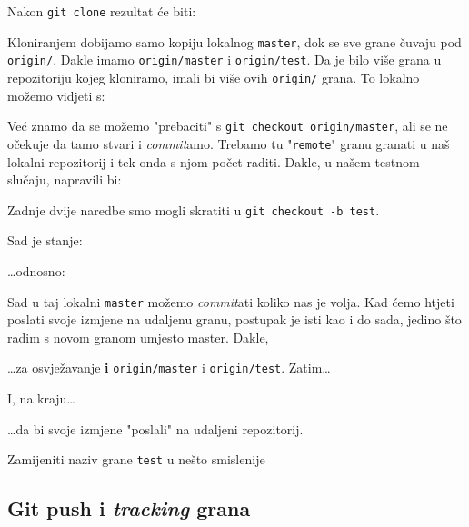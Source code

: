 Nakon \verb+git clone+ rezultat će biti:



Kloniranjem dobijamo samo kopiju lokalnog \verb+master+, dok se sve grane čuvaju pod \verb+origin/+. Dakle imamo \verb+origin/master+ i \verb+origin/test+.
Da je bilo više grana u repozitoriju kojeg kloniramo, imali bi više ovih \verb+origin/+ grana.
To lokalno možemo vidjeti s:



Već znamo da se možemo "prebaciti" s \verb+git checkout origin/master+, ali se ne očekuje da tamo stvari i \emph{commit}amo.
Trebamo tu "\verb+remote+" granu granati u naš lokalni repozitorij i tek onda s njom počet raditi.
Dakle, u našem testnom slučaju, napravili bi:


Zadnje dvije naredbe smo mogli skratiti u \verb+git checkout -b test+.

Sad je stanje:



\dots{}odnosno:



Sad u taj lokalni \verb+master+ možemo \emph{commit}ati koliko nas je volja.
Kad ćemo htjeti poslati svoje izmjene na udaljenu granu, postupak je isti kao i do sada, jedino što radim s novom granom umjesto master.
Dakle,


\dots{}za osvježavanje \textbf{i} \verb+origin/master+ i \verb+origin/test+.
Zatim\dots


I, na kraju\dots


\dots{}da bi svoje izmjene "poslali" na udaljeni repozitorij.

\TODO Zamijeniti naziv grane \verb+test+ u nešto smislenije

\subsection*{Git push i \emph{tracking} grana}

